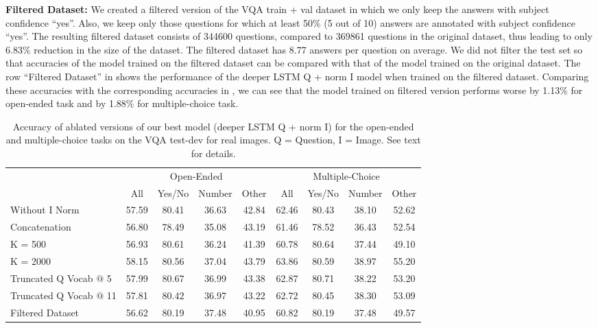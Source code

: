 \begin{compactenum}
\item \textbf{Filtered Dataset:} We created a filtered version of the VQA train + val dataset in which we only keep the answers with subject confidence ``yes''. Also, we keep only those questions for which at least 50\% (5 out of 10) answers are annotated with subject confidence ``yes''. The resulting filtered dataset consists of 344600 questions, compared to 369861 questions in the original dataset, thus leading to only 6.83\% reduction in the size of the dataset. The filtered dataset has 8.77 answers per question on average. We did not filter the test set so that accuracies of the model trained on the filtered dataset can be compared with that of the model trained on the original dataset. The row ``Filtered Dataset'' in  shows the performance of the deeper LSTM Q + norm I model when trained on the filtered dataset. Comparing these accuracies with the corresponding accuracies in , we can see that the model trained on filtered version performs worse by 1.13\% for open-ended task and by 1.88\% for multiple-choice task.
\end{compactenum}

\begin{table}[t] \scriptsize
\setlength{\tabcolsep}{1.8pt}
\begin{center}
\begin{tabular}{@{} l  c  c  c  c  c  c c c@{}}
\toprule
& \multicolumn{4}{c}{Open-Ended} & \multicolumn{4}{c}{Multiple-Choice} \\

\cmidrule[0.75pt](l){2-5}
\cmidrule[0.75pt](l){6-9}
 & All & Yes/No & Number & Other & All & Yes/No & Number & Other \\
\midrule
Without I Norm & 57.59 & 80.41 & 36.63 & 42.84 & 62.46 & 80.43 & 38.10 & 52.62 \\
Concatenation & 56.80 & 78.49 & 35.08 & 43.19 & 61.46 & 78.52 & 36.43 & 52.54 \\
K = 500 & 56.93 & 80.61 & 36.24 & 41.39 & 60.78 & 80.64 & 37.44 & 49.10 \\
K = 2000 & 58.15 & 80.56 & 37.04 & 43.79 & 63.86 & 80.59 & 38.97 & 55.20 \\
Truncated Q Vocab $@$ 5 & 57.99 & 80.67 & 36.99 & 43.38 & 62.87 & 80.71 & 38.22 & 53.20\\
Truncated Q Vocab $@$ 11 & 57.81 & 80.42 & 36.97 & 43.22 & 62.72 & 80.45 & 38.30 & 53.09\\
Filtered Dataset & 56.62 & 80.19 & 37.48 & 40.95 & 60.82 & 80.19 & 37.48 & 49.57 \\
\bottomrule
\end{tabular}	
\caption{Accuracy of ablated versions of our best model (deeper LSTM Q + norm I) for the open-ended and multiple-choice tasks on the VQA test-dev for real images. 
Q = Question, I = Image. 
See text for details.
}
\label{tab:abl_acc}
\end{center}
\end{table}